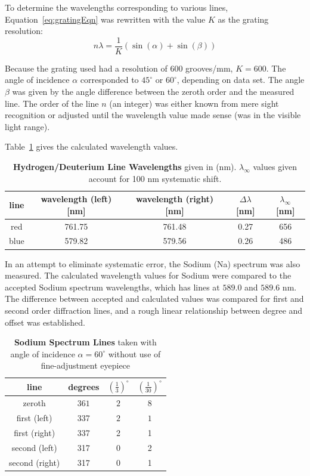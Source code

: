 \documentclass[paper=a4, fontsize=11pt]{scrartcl} %
\numberwithin{equation}{section}
\numberwithin{figure}{section}
\numberwithin{table}{section}
\begin{document}
To determine the wavelengths corresponding to various lines, Equation~\ref{eq:gratingEqn} was rewritten with the value $K$ as the grating resolution:
\begin{equation}
\label{eq:wavelengthEqn}
n \lambda = \dfrac{1}{K} \left( \sin(\alpha) + \sin(\beta) \right)
\end{equation}

 Because the grating used had a resolution of $600$ grooves/mm, $K=600$. The angle of incidence $\alpha$ corresponded to $45^\circ$ or $60^\circ$, depending on data set. The angle $\beta$ was given by the angle difference between the zeroth order and the measured line. The order of the line $n$ (an integer) was either known from mere sight recognition or adjusted until the wavelength value made sense (was in the visible light range).

Table~\ref{table:hd-calculated} gives the calculated wavelength values.

\begin{table}[H]
\centering
\caption{\textbf{Hydrogen/Deuterium Line Wavelengths} given in
  (nm). $\lambda_{\infty}$ values given account for 100 nm systematic shift. }
\begin{tabular}{ || c | c c c c || }
  \hline
  \hline
  line & wavelength (left) [nm] & wavelength (right) [nm] & $\Delta
  \lambda$ [nm] & $\lambda_{\infty}$ [nm] \\
  \hline
  red & 761.75 & 761.48 & 0.27 & 656\\
  blue & 579.82 & 579.56 & 0.26 & 486\\
  \hline
  \hline
\end{tabular}
\label{table:hd-calculated}
\end{table}

\vspace{1.7em}


In an attempt to eliminate systematic error, the Sodium (Na) spectrum was also measured. The calculated wavelength values for Sodium were compared to the accepted Sodium spectrum wavelengths, which has lines at $589.0$ and $589.6$ nm. The difference between accepted and calculated values was compared for first and second order diffraction lines, and a rough linear relationship between degree and offset was established.

\begin{table}[H]
\centering
\caption{\textbf{Sodium Spectrum Lines} taken with angle of incidence $\alpha = 60^\circ$ without use of fine-adjustment eyepiece }
\begin{tabular}{ || c | c c c || }
  \hline
  \hline
  line & degrees & $(\frac{1}{3})^\circ$ & $(\frac{1}{30})^\circ$  \\
  \hline
  zeroth & $361$ & $2$ & $8$  \\
  first (left) & 337 & $2$ & $1$  \\
  first (right) & 337 & 2 & 1 \\
  second (left) & 317 & 0 & 2 \\
  second (right) & 317 & 0 & 1 \\
  \hline
  \hline
\end{tabular}
\label{table:sodium60}
\end{table}
\end{document}

